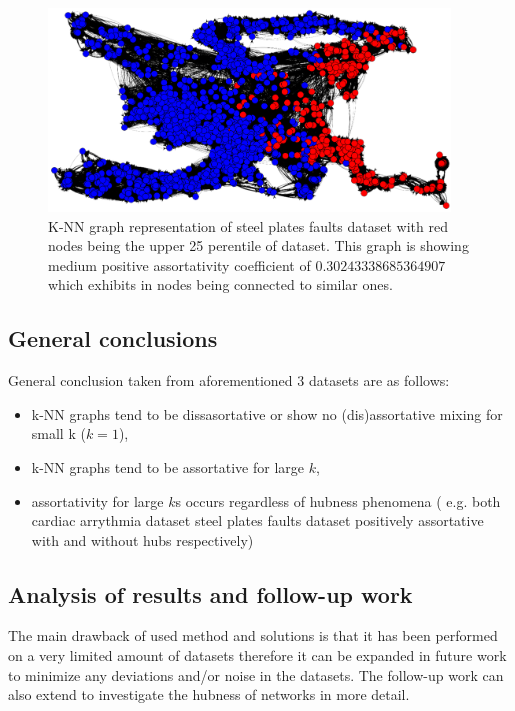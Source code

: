 \begin{figure}[h!]
  \centering
  \captionsetup{justification=centering}
    \includegraphics[width=0.95\textwidth]{images/faults_graph.png}
  \caption{K-NN graph representation of steel plates faults dataset with red nodes being the upper 25 perentile of dataset. This graph is showing medium positive assortativity coefficient of $0.30243338685364907$ which exhibits in nodes being connected to similar ones.}
  \label{fig:graph_faults_nodes}
\end{figure}

\subsection{General conclusions}
General conclusion taken from aforementioned 3 datasets are as follows:
\begin{itemize}
\item k-NN graphs tend to be dissasortative or show no (dis)assortative mixing for small k ($k = 1$),
\item k-NN graphs tend to be assortative for large $k$,
\item assortativity for large $k$s occurs regardless of hubness phenomena ( e.g. both cardiac arrythmia dataset steel plates faults dataset positively assortative with and without hubs respectively) 
\end{itemize}


\subsection{Analysis of results and follow-up work}
The main drawback of used method and solutions is that it has been performed on a very limited amount of datasets therefore it can be expanded in future work to minimize any deviations and/or noise in the datasets.
The follow-up work can also extend to investigate the hubness of networks in more detail.